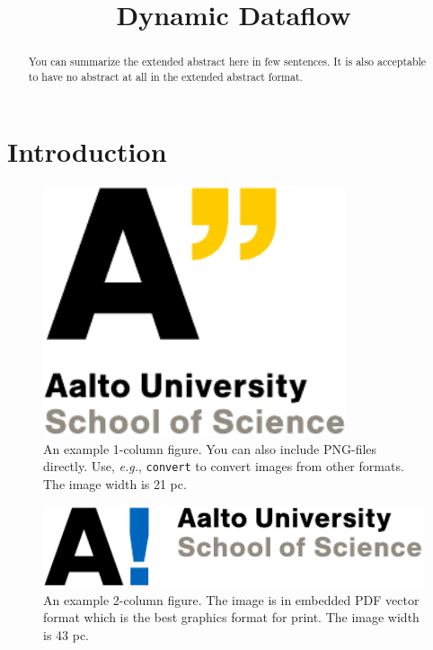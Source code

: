\documentclass[conference,a4paper]{IEEEtran}
\begin{document}
%
\title{Dynamic Dataflow}

\author{
}

\maketitle

\begin{abstract}
You can summarize the extended abstract here in few sentences. It is
also acceptable to have no abstract at all in the extended abstract
format.
\end{abstract}

\section{Introduction}
\begin{figure}[!t]
\centering
\includegraphics[width=21pc]{Aalto_EN_SCI_21_RGB_y2.pdf}
\caption{An example 1-column figure. You can also include PNG-files
  directly. Use, \emph{e.g.}, \texttt{convert} to convert images from
  other formats. The image width is 21 pc.}
\label{fig:example-1col}
\end{figure}

\begin{figure}[t]
\centering
\includegraphics[width=43pc]{Aalto_EN_SCI_13_RGB_b1.pdf}
\caption{An example 2-column figure. The image is in embedded PDF
  vector format which is the best graphics format for print. The image
  width is 43 pc.}
\label{fig:example-2col}
\end{figure}



\end{document}

